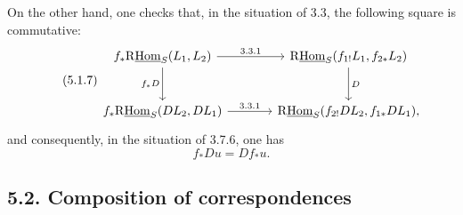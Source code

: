 \documentclass[11pt]{article}
\begin{document}
On the other hand, one checks that, in the situation of 3.3, the following square is commutative:
\begin{equation}
\tag{5.1.7}
\begin{tikzcd}[column sep=large,row sep=large]
f_*\mathrm{R}\underline{\mathrm{Hom}}_S(L_1,L_2) \arrow[r,"3.3.1"] \arrow[d,"f_*D"']
& \mathrm{R}\underline{\mathrm{Hom}}_S(f_{1!}L_1,f_{2*}L_2) \arrow[d,"D"] \\
f_*\mathrm{R}\underline{\mathrm{Hom}}_S(DL_2,DL_1) \arrow[r,"3.3.1"]
& \mathrm{R}\underline{\mathrm{Hom}}_S(f_{2!}DL_2,f_{1*}DL_1),
\end{tikzcd}
\end{equation}
and consequently, in the situation of 3.7.6, one has
\begin{equation}
\tag{5.1.8}
f_*Du=Df_*u.
\end{equation}

\subsection*{5.2. Composition of correspondences}
\end{document}
